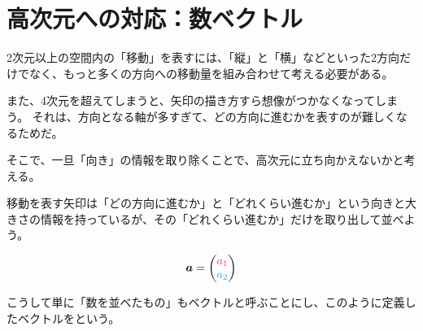\documentclass[../../../topic_linear-algebra]{subfiles}
\begin{document}
\sectionline
\section{高次元への対応：数ベクトル}

2次元以上の空間内の「移動」を表すには、「縦」と「横」などといった2方向だけでなく、もっと多くの方向への移動量を組み合わせて考える必要がある。

また、4次元を超えてしまうと、矢印の描き方すら想像がつかなくなってしまう。
それは、方向となる軸が多すぎて、どの方向に進むかを表すのが難しくなるためだ。

\br

そこで、一旦「向き」の情報を取り除くことで、高次元に立ち向かえないかと考える。

移動を表す矢印は「どの方向に進むか」と「どれくらい進むか」という向きと大きさの情報を持っているが、その「どれくらい進むか」だけを取り出して並べよう。

\begin{figure}[h]
  \centering
  \begin{minipage}{0.4\columnwidth}
    \centering
  \end{minipage}
  \begin{minipage}{0.4\columnwidth}
    \centering
    \large
    \color{BurntOrange}
    \begin{equation*}
      \vb*{a} = \begin{pmatrix} \textcolor{Rhodamine}{a_1} \\ \textcolor{Cerulean}{a_2} \end{pmatrix}
    \end{equation*}
  \end{minipage}
\end{figure}

こうして単に「数を並べたもの」もベクトルと呼ぶことにし、このように定義したベクトルをという。
\end{document}
